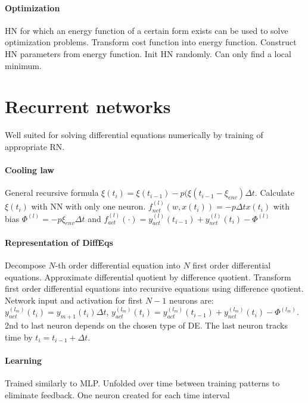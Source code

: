 \paragraph{Optimization}
HN  for which an energy function of a certain form exists can be used to solve optimization problems. Transform cost function into energy function. Construct HN parameters from energy function. Init HN randomly. Can only find a local minimum. 


\section{Recurrent networks}
Well suited for solving differential equations numerically by training of appropriate RN.

\paragraph{Cooling law}
General recursive formula $\xi(t_i)=\xi(t_{i-1})-p(\xi(t_{i-1}-\xi_{env})\Delta t$. Calculate $\xi(t_i)$ with NN with only one neuron. $f_{net}^{(l)}(w,x(t_i))= -p \Delta t x(t_i)$ with bias $\Phi^{(l)}=-p \xi_{env} \Delta t$ and $f_{act}^{(l)}(\cdot)=y_{act}^{(l)}(t_{i-1})+y_{net}^{(l)}(t_i)-\Phi^{(l)}$

\paragraph{Representation of DiffEqs}
Decompose $N$-th order differential equation into $N$ first order differential equations. Approximate differential quotient by difference quotient. Transform first order differential equations into recursive equations using difference quotient. Network input and activation for first $N-1$ neurons are: $y_{net}^{(l_m)}(t_i)=y_{m+1}(t_i)\Delta t$, $y_{act}^{(l_m)}(t_i)=y_{act}^{(l_m)}(t_{i-1})+y_{net}^{(l_m)}(t_i)-\Phi^{(l_m)}$. 2nd to last neuron depends on the chosen type of DE. The last neuron tracks time by $t_i=t_{i-1}+\Delta t$.

\paragraph{Learning}
Trained similarly to MLP. Unfolded over time between training patterns to eliminate feedback. One neuron created for each time interval












